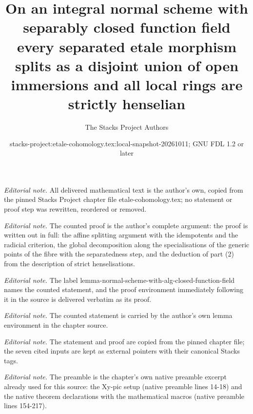 \documentclass[10pt,a4paper]{amsart}
\title{On an integral normal scheme with separably closed function field every separated etale morphism splits as a disjoint union of open immersions and all local rings are strictly henselian}
\author{The Stacks Project Authors}
\date{stacks-project:etale-cohomology.tex:local-snapshot-20261011; GNU FDL 1.2 or later}
\theoremstyle{plain}
\theoremstyle{definition}
\theoremstyle{remark}
\numberwithin{equation}{subsection}
\begin{document}
\maketitle
\noindent\textit{Editorial note.} All delivered mathematical text is the author's own, copied from the pinned Stacks Project chapter file etale-cohomology.tex; no statement or proof step was rewritten, reordered or removed.\par\medskip
\noindent\textit{Editorial note.} The counted proof is the author's complete argument: the proof is written out in full: the affine splitting argument with the idempotents and the radicial criterion, the global decomposition along the specialisations of the generic points of the fibre with the separatedness step, and the deduction of part (2) from the description of strict henselisations.\par\medskip
\noindent\textit{Editorial note.} The label lemma-normal-scheme-with-alg-closed-function-field names the counted statement, and the proof environment immediately following it in the source is delivered verbatim as its proof.\par\medskip
\noindent\textit{Editorial note.} The counted statement is carried by the author's own lemma environment in the chapter source.\par\medskip
\noindent\textit{Editorial note.} The statement and proof are copied from the pinned chapter file; the seven cited inputs are kept as external pointers with their canonical Stacks tags.\par\medskip
\noindent\textit{Editorial note.} The preamble is the chapter's own native preamble excerpt already used for this source: the Xy-pic setup (native preamble lines 14-18) and the native theorem declarations with the mathematical macros (native preamble lines 154-217).\par\medskip
\end{document}
